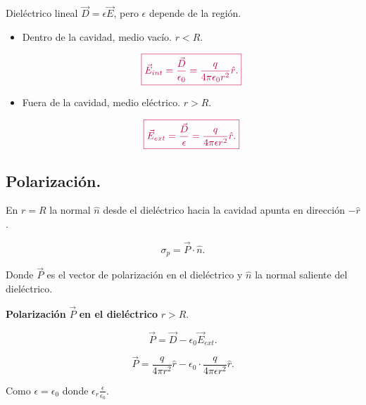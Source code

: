 \documentclass[a4paper,12pt]{article} %
\begin{document}
\begin{justify}
	Dieléctrico lineal \(\vec{D} = \epsilon \vec{E} \), pero \(\epsilon\) depende de la región.
\end{justify}

\begin{justify}
	\begin{itemize}
		\item Dentro de la cavidad, medio vacío. \(r < R \).

		      \[ \textcolor{purple}{\boxed{\vec{E}_{int} = \frac{\vec{D}}{\epsilon_0} = \frac{q}{4 \pi \epsilon_0 r^2}\hat{r}.}} \]

		\item Fuera de la cavidad, medio eléctrico. \( r > R \).

		      \[ \textcolor{purple}{\boxed{\vec{E}_{ext} = \frac{\vec{D}}{\epsilon} = \frac{q}{4 \pi \epsilon r^2}\hat{r}.}} \]
	\end{itemize}
\end{justify}

\subsection{Polarización.}

\begin{justify}
	En \(r = R\) la normal \(\hat{n}\) desde el dieléctrico hacia la cavidad apunta en dirección \(- \hat{r}\).
\end{justify}

\[ \sigma_p = \vec{P} \cdot \hat{n}. \]

\begin{justify}
	Donde \(\vec{P}\) es el vector de polarización en el dieléctrico y \(\hat{n}\) la normal saliente del dieléctrico.
\end{justify}


\begin{justify}
	\textbf{Polarización} \(\vec{P}\) \textbf{en el dieléctrico} \(r > R.\)
\end{justify}

\[ \vec{P} = \vec{D} - \epsilon_0 \vec{E}_{ext}.  \]

\[ \vec{P} = \frac{q}{4 \pi r^2} \hat{r} - \epsilon_0 \cdot \frac{q}{4 \pi \epsilon r^2} \hat{r}. \]

\begin{justify}
	Como \(\epsilon = \epsilon_0\) donde \(\epsilon_r \frac{\epsilon}{\epsilon_0}. \)
\end{justify}
\end{document}
